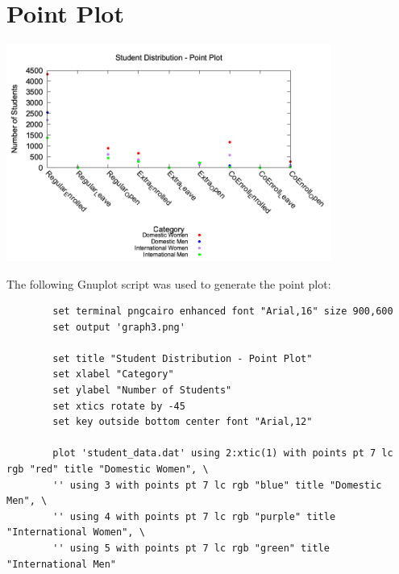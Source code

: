 \documentclass{article}
\begin{document}
	\section{Point Plot}
	\begin{minipage}{\textwidth}
		\centering
		\includegraphics[width=0.8\textwidth]{graph3.png}
		\label{fig:point}
	\end{minipage}
	
	\vspace{1em}
	
	\noindent The following Gnuplot script was used to generate the point plot:
	\begin{lstlisting}
		set terminal pngcairo enhanced font "Arial,16" size 900,600
		set output 'graph3.png'
		
		set title "Student Distribution - Point Plot"
		set xlabel "Category"
		set ylabel "Number of Students"
		set xtics rotate by -45
		set key outside bottom center font "Arial,12"
		
		plot 'student_data.dat' using 2:xtic(1) with points pt 7 lc rgb "red" title "Domestic Women", \
		'' using 3 with points pt 7 lc rgb "blue" title "Domestic Men", \
		'' using 4 with points pt 7 lc rgb "purple" title "International Women", \
		'' using 5 with points pt 7 lc rgb "green" title "International Men"
	\end{lstlisting}
	
	\clearpage
	
\end{document}

